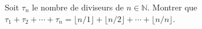 Soit $\tau_n$ le nombre de diviseurs de $n \in \mathbb{N}$. Montrer que $\tau_1 + \tau_2 + \cdots + \tau_n = \lfloor n/1 \rfloor + \lfloor n/2 \rfloor + \cdots + \lfloor n/n \rfloor$.
